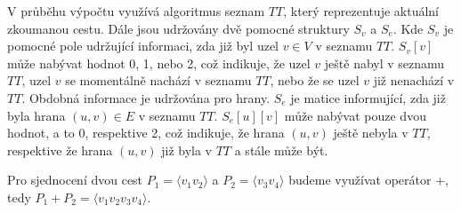         V průběhu výpočtu využívá algoritmus seznam $TT$, který reprezentuje aktuální zkoumanou cestu. Dále jsou udržovány dvě pomocné struktury $S_v$ a $S_e$. Kde $S_v$ je pomocné pole udržující informaci, zda již byl uzel $v \in V$ v seznamu $TT$. $S_v[v]$ může nabývat hodnot 0, 1, nebo 2, což indikuje, že uzel $v$ ještě nabyl v seznamu $TT$, uzel $v$ se momentálně nachází v seznamu $TT$, nebo že se uzel $v$ již nenachází v $TT$. Obdobná informace je udržována pro hrany. $S_e$ je matice informující, zda již byla hrana $(u, v) \in E$ v seznamu $TT$. $S_e[u][v]$ může nabývat pouze dvou hodnot, a to 0, respektive 2, což indikuje, že hrana $(u, v)$ ještě nebyla v $TT$, respektive že hrana $(u, v)$ již byla v $TT$ a stále může být.

        Pro sjednocení dvou cest $P_1 = \langle v_1v_2 \rangle$ a $P_2 = \langle v_3v_4 \rangle$ budeme využívat operátor $+$, tedy $P_1 + P_2 = \langle v_1v_2v_3v_4 \rangle$.

